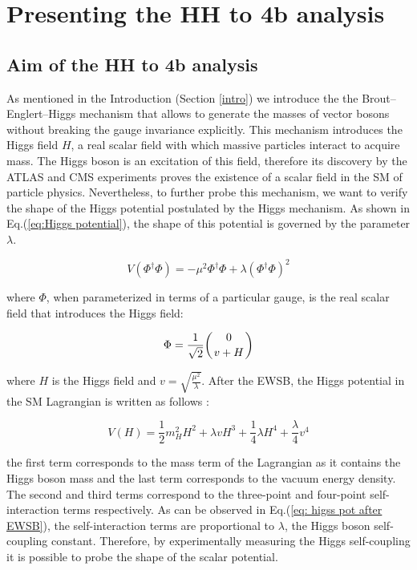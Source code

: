 \section{Presenting the HH to 4b analysis} \label{section: HH4b}

\subsection{Aim of the HH to 4b analysis}

As mentioned in the Introduction (Section \ref{intro}) we introduce the the Brout–Englert–Higgs mechanism that allows to generate the masses of vector bosons without breaking the gauge invariance explicitly. This mechanism introduces the Higgs field $H$, a real scalar field with which massive particles interact to acquire mass. The Higgs boson is an excitation of this field, therefore its discovery by the ATLAS and CMS experiments proves the existence of a scalar field in the SM of particle physics. Nevertheless, to further probe this mechanism, we want to verify the shape of the Higgs potential postulated by the Higgs mechanism. As shown in Eq.(\ref{eq:Higgs potential}), the shape of this potential is governed by the parameter $\lambda$.

\begin{equation}
    V(\Phi^\dag \Phi)=-\mu^2 \Phi^\dag \Phi + \lambda (\Phi^\dag \Phi)^2
    \label{eq:Higgs potential}
\end{equation}

\noindent where $\Phi$, when parameterized in terms of a particular gauge, is the real scalar field that introduces the Higgs field:

\begin{equation}
    \Phi= \frac{1}{\sqrt{2}}\bigg( {0 \atop v + H} \bigg)
\end{equation}

\noindent where $H$ is the Higgs field and $v=\sqrt{\frac{\mu^2}{\lambda}}$. After the EWSB, the Higgs potential in the SM Lagrangian is written as follows \cite{higgs_potential}:

\begin{equation}
    V(H)= \frac{1}{2} m_H^2 H^2 + \lambda v H^3 +\frac{1}{4} \lambda H^4 + \frac{\lambda}{4} v^4
    \label{eq: higss pot after EWSB}
\end{equation}

\noindent the first term corresponds to the mass term of the Lagrangian as it contains the Higgs boson mass and the last term corresponds to the vacuum energy density. The second and third terms correspond to the three-point and four-point self-interaction terms respectively. As can be observed in Eq.(\ref{eq: higss pot after EWSB}), the self-interaction terms are proportional to $\lambda$, the Higgs boson self-coupling constant. Therefore, by experimentally measuring the Higgs self-coupling it is possible to probe the shape of the scalar potential.


